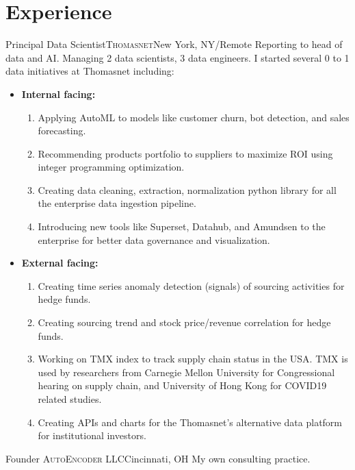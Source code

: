 \documentclass[12pt,a4paper,sans]{moderncv} %
\begin{document}
\section{Experience}
 
 {Principal Data Scientist}{\textsc{Thomasnet}}{New York, NY/Remote}{}{
Reporting to head of data and AI. Managing 2 data scientists, 3 data engineers.
I started several 0 to 1 data initiatives at Thomasnet including:}
\begin{itemize}
\item \textbf{Internal facing:}
    \begin{enumerate}
    \item Applying AutoML to models like customer churn, bot detection, and sales forecasting.
    \item Recommending products portfolio to suppliers to maximize ROI using integer programming optimization.
    \item  Creating data cleaning, extraction, normalization python library for all the enterprise data ingestion pipeline.
    \item Introducing new tools like Superset, Datahub, and Amundsen to the enterprise for better data governance and visualization.
    \end{enumerate}
\item \textbf{External facing:}
    \begin{enumerate}
    \item Creating time series anomaly detection (signals) of sourcing activities for hedge funds.
    \item Creating sourcing trend and stock price/revenue correlation for hedge funds.
    \item Working on TMX index to track supply chain status in the USA. TMX is used by researchers from Carnegie Mellon University for Congressional hearing on supply chain, and University of Hong Kong for COVID19 related studies.
    \item Creating APIs and charts for the Thomasnet's alternative data platform for institutional investors.
    \end{enumerate}
\end{itemize}
 \bigskip

 
 {Founder}
{\textsc{AutoEncoder LLC}}{Cincinnati, OH}{}{}
My own consulting practice.
\end{document}
